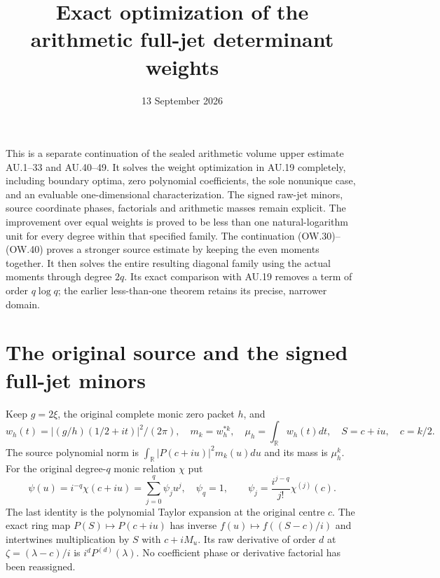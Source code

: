 \documentclass[11pt]{article}
\title{Exact optimization of the arithmetic full-jet determinant weights}
\author{}
\date{13 September 2026}
\newcommand{\R}{\mathbb R}
\begin{document}
\maketitle

This is a separate continuation of the sealed arithmetic volume upper
estimate AU.1--33 and AU.40--49. It solves the weight optimization in
AU.19 completely, including boundary optima, zero polynomial coefficients,
the sole nonunique case, and an evaluable one-dimensional characterization.
The signed raw-jet minors, source coordinate phases, factorials and
arithmetic masses remain explicit. The improvement over equal weights is
proved to be less than one natural-logarithm unit for every degree within
that specified family. The continuation (OW.30)--(OW.40) proves a stronger
source estimate by keeping the even moments together. It then solves the
entire resulting diagonal family using the actual moments through degree
$2q$. Its exact comparison with AU.19 removes a term of order $q\log q$;
the earlier less-than-one theorem retains its precise, narrower domain.

\section{The original source and the signed full-jet minors}

Keep $g=2\xi$, the original complete monic zero packet $h$, and
\[
 w_h(t)=|(g/h)(1/2+it)|^2/(2\pi),\quad
 m_k=w_h^{*k},\quad \mu_h=\int_\R w_h(t)dt,\quad
 S=c+iu,\quad c=k/2.                                      \tag{OW.1}
\]
The source polynomial norm is
$\int_\R|P(c+iu)|^2m_k(u)du$ and its mass is $\mu_h^k$.
For the original degree-$q$ monic relation $\chi$ put
\[
 \psi(u)=i^{-q}\chi(c+iu)=\sum_{j=0}^q\psi_ju^j,
 \quad\psi_q=1,\qquad
 \psi_j=\frac{i^{j-q}}{j!}\chi^{(j)}(c).                  \tag{OW.2}
\]
The last identity is the polynomial Taylor expansion at the original
centre $c$. The exact ring map $P(S)\mapsto P(c+iu)$ has inverse
$f(u)\mapsto f((S-c)/i)$ and intertwines multiplication by $S$ with
$c+iM_u$. Its raw derivative of order $d$ at
$\zeta=(\lambda-c)/i$ is $i^dP^{(d)}(\lambda)$.
No coefficient phase or derivative factorial has been reassigned.
\end{document}
